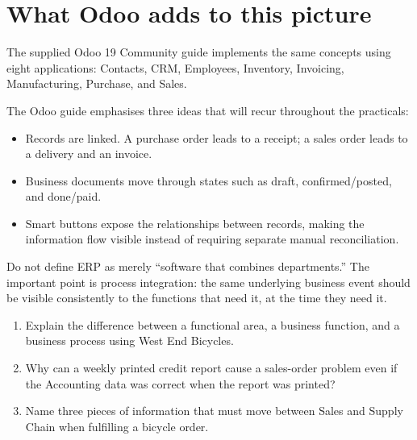 \section{What Odoo adds to this picture}

The supplied Odoo 19 Community guide implements the same concepts using eight applications: Contacts, CRM, Employees, Inventory, Invoicing, Manufacturing, Purchase, and Sales.

\begin{odoobox}
The Odoo guide emphasises three ideas that will recur throughout the practicals:
\begin{itemize}
  \item Records are linked. A purchase order leads to a receipt; a sales order leads to a delivery and an invoice.
  \item Business documents move through states such as draft, confirmed/posted, and done/paid.
  \item Smart buttons expose the relationships between records, making the information flow visible instead of requiring separate manual reconciliation.
\end{itemize}
\end{odoobox}

\begin{pitfall}
Do not define ERP as merely ``software that combines departments.'' The important point is process integration: the same underlying business event should be visible consistently to the functions that need it, at the time they need it.
\end{pitfall}

\begin{quickcheck}
\begin{enumerate}
  \item Explain the difference between a functional area, a business function, and a business process using West End Bicycles.
  \item Why can a weekly printed credit report cause a sales-order problem even if the Accounting data was correct when the report was printed?
  \item Name three pieces of information that must move between Sales and Supply Chain when fulfilling a bicycle order.
\end{enumerate}
\end{quickcheck}

